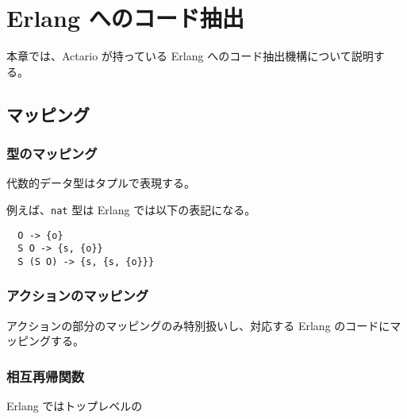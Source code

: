 \chapter{Erlang へのコード抽出}

本章では、Actario が持っている Erlang へのコード抽出機構について説明する。

\section{マッピング}

\subsection{型のマッピング}

代数的データ型はタプルで表現する。

例えば、\texttt{nat} 型は Erlang では以下の表記になる。


\begin{lstlisting}
  O -> {o}
  S O -> {s, {o}}
  S (S O) -> {s, {s, {o}}}
\end{lstlisting}

\subsection{アクションのマッピング}

アクションの部分のマッピングのみ特別扱いし、対応する Erlang のコードにマッピングする。

\subsection{相互再帰関数}

Erlang ではトップレベルの
